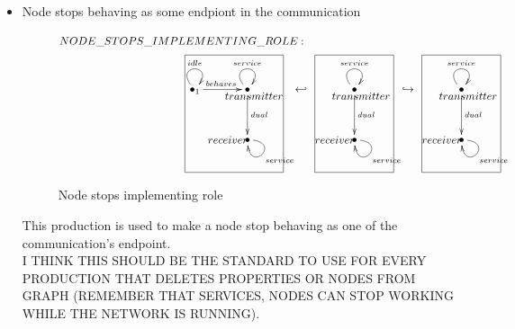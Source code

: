 \documentclass[envcountsect,runningheads]{llncs}
\begin{document}
\begin{itemize}
 \item Node stops behaving as some endpiont in the communication
  \begin{figure}[H]
    \[
       \xymatrix@C=35pt@R=35pt
       {
         {}\POS[]-<1pc,0pc>\drop{NODE\_STOPS\_IMPLEMENTING\_ROLE:}
         \\
         {\bullet}_{1} \ar@(ul,ur)^{idle} \ar@{->}^{behaves}[r] &
         {\bullet} \ar@(ul,ur)^{service} \ar@{->}^{dual}[d] \POS[]-<-0.5pc,.5pc> \drop{transmitter}
         & {\hookleftarrow} &
         {\bullet} \ar@(ul,ur)^{service} \ar@{->}^{dual}[d]  \POS[]-<-0.5pc,.5pc> \drop{transmitter}
         & {\hookrightarrow} &
         {\bullet} \ar@(ul,ur)^{service} \ar@{->}^{dual}[d] \POS[]-<-0.5pc,.5pc> \drop{transmitter}
         \\
         & {\bullet} \ar@(r,d)^{service} \POS[]-<1.5pc,0pc> \drop{receiver}
         \POS[]+<-1pc,2pc> *+=<7.5pc,9pc>[F-]{} & 
         & {\bullet} \ar@(r,d)^{service} \POS[]-<1.5pc,0pc> \drop{receiver}
         \POS[]+<0pc,2pc> *+=<6pc,9pc>[F-]{} &
         & {\bullet} \ar@(r,d)^{service} \POS[]-<1.5pc,0pc> \drop{receiver}
         \POS[]+<0pc,2pc> *+=<6pc,9pc>[F-]{}
       }
    \]
    \caption{Node stops implementing role}
    \protect\label{fig:deattachmentnodetoservice}
  \end{figure}
  This production is used to make a node stop behaving as one of the communication's 
  endpoint.\\
  I THINK THIS SHOULD BE THE STANDARD TO USE FOR EVERY PRODUCTION THAT DELETES
  PROPERTIES OR NODES FROM GRAPH (REMEMBER THAT SERVICES, NODES CAN STOP 
  WORKING WHILE THE NETWORK IS RUNNING).\\
   

\end{itemize}
\end{document}
